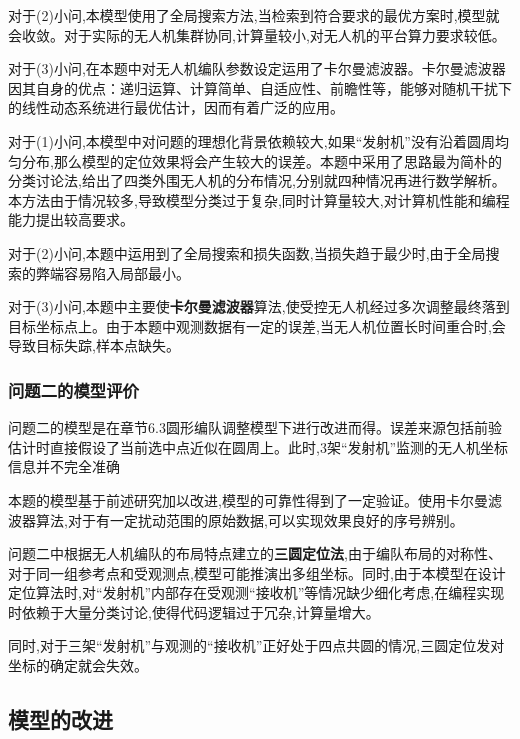 \documentclass[withoutpreface,bwprint]{cumcmthesis} %
\begin{document}
					对于(2)小问,本模型使用了全局搜索方法,当检索到符合要求的最优方案时,模型就会收敛。对于实际的无人机集群协同,计算量较小,对无人机的平台算力要求较低。
					
					对于(3)小问,在本题中对无人机编队参数设定运用了卡尔曼滤波器。卡尔曼滤波器因其自身的优点：递归运算、计算简单、自适应性、前瞻性等，能够对随机干扰下的线性动态系统进行最优估计，因而有着广泛的应用。
				
				
					对于(1)小问,本模型中对问题的理想化背景依赖较大,如果“发射机”没有沿着圆周均匀分布,那么模型的定位效果将会产生较大的误差。本题中采用了思路最为简朴的分类讨论法,给出了四类外围无人机的分布情况,分别就四种情况再进行数学解析。本方法由于情况较多,导致模型分类过于复杂,同时计算量较大,对计算机性能和编程能力提出较高要求。
					
					对于(2)小问,本题中运用到了全局搜索和损失函数,当损失趋于最少时,由于全局搜索的弊端容易陷入局部最小。
				
					对于(3)小问,本题中主要使\textbf{卡尔曼滤波器}算法,使受控无人机经过多次调整最终落到目标坐标点上。由于本题中观测数据有一定的误差,当无人机位置长时间重合时,会导致目标失踪,样本点缺失。
				 
\subsubsection{问题二的模型评价}
	
			问题二的模型是在章节6.3圆形编队调整模型下进行改进而得。误差来源包括前验估计时直接假设了当前选中点近似在圆周上。此时,3架“发射机”监测的无人机坐标信息并不完全准确
			
		
			本题的模型基于前述研究加以改进,模型的可靠性得到了一定验证。使用卡尔曼滤波器算法,对于有一定扰动范围的原始数据,可以实现效果良好的序号辨别。
		
			
			问题二中根据无人机编队的布局特点建立的\textbf{三圆定位法},由于编队布局的对称性、对于同一组参考点和受观测点,模型可能推演出多组坐标。同时,由于本模型在设计定位算法时,对“发射机”内部存在受观测“接收机”等情况缺少细化考虑,在编程实现时依赖于大量分类讨论,使得代码逻辑过于冗杂,计算量增大。
			
			同时,对于三架“发射机”与观测的“接收机”正好处于四点共圆的情况,三圆定位发对坐标的确定就会失效。
			
	\subsection{模型的改进}	
	
\end{document}
